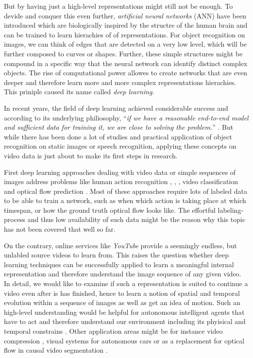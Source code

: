 But by having just a high-level representations might still not be enough. To devide and conquer this even further, \textit{artificial neural networks} (ANN) have been introduced which are biologically inspired by the structre of the human brain \parencite{ann} and can be trained to learn hierachies of of representations. For object recognition on images, we can think of edges that are detected on a very low level, which will be further composed to curves or shapes. Further, these simple structures might be compound in a specific way that the neural network can identify distinct complex objects. The rise of computational power allowes to create networks that are even deeper and therefore learn more and more complex representations hierachies. This priniple caused its name called \textit{deep learning}.

In recent years, the field of deep learning achieved considerable success and according to its underlying philiosophy, ``\textit{if we have a reasonable end-to-end model and sufficient data for training it, we are close to solving the problem.}'' \parencite{conv_lstm_nowcasting}. But while there has been done a lot of studies and practical application of object recognition on static images or speech recognition, applying these concepts on video data is just about to make its first steps in research. 

First deep learning approaches dealing with video data or simple sequences of images address problems like human action recognition \parencite{conv3d_action_class}, \parencite{two_stream_action}, \parencite{longterm_rec_recog}, video classification \parencite{large_video_class} and optical flow prediction \parencite{flownet}. Most of these approaches require lots of labeled data to be able to train a network, such as when which action is taking place at which timespan, or how the ground truth optical flow looks like. The effortful labeling-process and thus low availability of such data might be the reason why this topic has not been covered that well so far.

On the contrary, online services like \textit{YouTube} provide a seemingly endless, but unlabled source videos to learn from. This raises the question whether deep learning techniques can be successfully applied to learn a meaningful internal representation and therefore understand the image sequence of any given video. In detail, we would like to examine if such a representation is suited to continue a video even after is has finished, hence to learn a notion of spatial and temporal evolution within a sequence of images as well as get an idea of motion. Such an high-level understanding would be helpful for autonomous intelligent agents that have to act and therefore understand our environment including its phyisical and temporal constrains \parencite{unsup_learn_lstm}. Other application areas might be for instance video compression \parencite{frame_interpol}, visual systems for autonomous cars or as a replacement for optical flow in causal video segmentation \parencite{causal_video_seg}.

